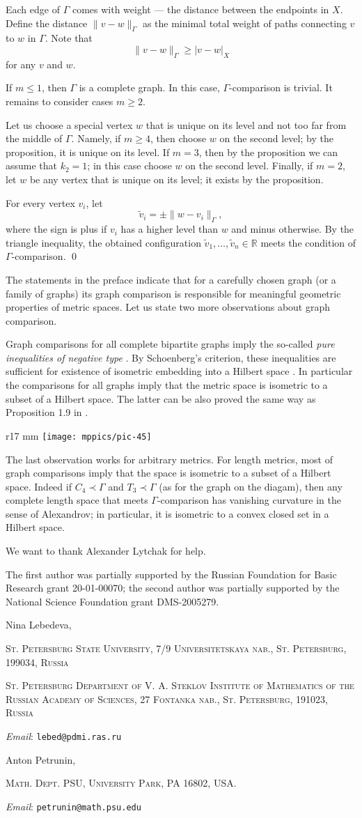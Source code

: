 \documentclass{article}
\makeatletter
\newcommand{\Addresses}{{\bigskip\footnotesize

\noindent Nina Lebedeva,
\par\nopagebreak
 \textsc{St. Petersburg State University, 7/9 Universitetskaya nab., St. Petersburg, 199034, Russia}
\par
\nopagebreak
 \textsc{St. Petersburg Department of V. A. Steklov Institute of Mathematics of the Russian Academy of Sciences, 27 Fontanka nab., St. Petersburg, 191023, Russia}
  \par\nopagebreak
  \textit{Email}: \texttt{lebed@pdmi.ras.ru}

\medskip

\noindent   Anton Petrunin, 
\par\nopagebreak
 \textsc{Math. Dept. PSU, University Park, PA 16802, USA.}
  \par\nopagebreak
  \textit{Email}: \texttt{petrunin@math.psu.edu}
  
}}
\def\parbf#1{\medskip\noindent{\bf #1}}
\def\qeds{\qed\par\medskip}
\makeatother
\begin{document}
Each edge of $\Gamma$ comes with weight --- the distance between the endpoints in $X$.
Define the distance $\|v-w\|_\Gamma$ as the minimal total weight of paths connecting $v$ to $w$ in $\Gamma$.
Note that 
\[\|v-w\|_\Gamma\geqslant |v-w|_X\]
for any $v$ and $w$.

If $m\leqslant 1$, then $\Gamma$ is a complete graph.
In this case, $\Gamma$-comparison is trivial.
It remains to consider cases $m\geqslant2$.

Let us choose a special vertex $w$ that is unique on its level and not too far from the middle of $\Gamma$.
Namely, if $m\geqslant 4$, then choose $w$ on the second level;
by the proposition, it is unique on its level.
If $m=3$, then by the proposition we can assume that $k_2=1$; in this case choose $w$ on the second level.
Finally, if $m=2$, let $w$ be any vertex that is unique on its level; it exists by the proposition. 

For every vertex $v_i$, let
\[\tilde v_i=\pm \|w-v_i\|_\Gamma,\]
where the sign is plus if $v_i$ has a higher level than $w$ and minus otherwise.
By the triangle inequality, the obtained configuration $\tilde v_1,\dots,\tilde v_n\in\mathbb{R}$ meets the condition of $\Gamma$-comparison.
\qeds

\parbf{Remarks.}
The statements in the preface indicate that for a carefully chosen graph (or a family of graphs) its graph comparison is responsible for meaningful geometric properties of metric spaces.
Let us state two more observations about graph comparison.

Graph comparisons for all complete bipartite graphs imply the so-called \emph{pure inequalities of negative type} \cite[6.1.1]{deza-laurent}.
By Schoenberg's criterion, these inequalities are sufficient for existence of isometric embedding into a Hilbert space \cite[6.2.1]{deza-laurent}.
In particular the comparisons for all graphs imply that the metric space is isometric to a subset of a Hilbert space.
The latter can be also proved the same way as Proposition 1.9 in \cite{toyoda}.

\begin{wrapfigure}{r}{17 mm}
\vskip-6mm
\centering
\texttt{[image: mppics/pic-45]}
\vskip-2mm
\end{wrapfigure}

The last observation works for arbitrary metrics.
For length metrics, most of graph comparisons imply that the space is isometric to a subset of a Hilbert space.
Indeed if $C_4\prec\Gamma$ and $T_3\prec\Gamma$ (as for the graph on the diagam), then any complete length space that meets $\Gamma$-comparison has vanishing curvature in the sense of Alexandrov; in particular, it is isometric to a convex closed set in a Hilbert space.





\parbf{Acknowledgments.}
We want to thank Alexander Lytchak for help. 

The first author was partially supported by the Russian Foundation for Basic Research grant 20-01-00070; the second author was partially supported by the National Science Foundation grant DMS-2005279.

{\sloppy
\printbibliography[heading=bibintoc]
\fussy
}

\Addresses
\end{document}
